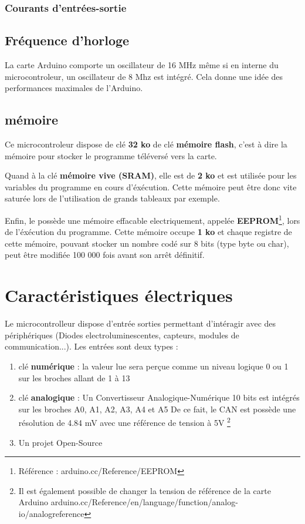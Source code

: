 \documentclass[12pt]{report}
\begin{document}
\subsubsection {Courants d'entrées-sortie}

\subsection {Fréquence d'horloge}

La carte Arduino comporte un oscillateur de 16 MHz même si en interne du microcontroleur, un oscillateur de 8 Mhz est intégré.
Cela donne une idée des performances maximales de l'Arduino.



\subsection {mémoire}

Ce microcontroleur dispose de clé \textbf{32 ko} de clé \textbf{mémoire flash}, c'est à dire la mémoire pour stocker le programme téléversé vers la carte. \newline


Quand à la clé \textbf{mémoire vive (SRAM)}, elle est de \textbf{2 ko} et est utilisée pour les variables du programme en cours d'éxécution. \newline
Cette mémoire peut être donc vite saturée lors de l'utilisation de grands tableaux par exemple. \newline


Enfin, le  possède une mémoire effacable electriquement, appelée \textbf{EEPROM}\footnote{Référence : arduino.cc/Reference/EEPROM}, lors de l'éxécution du programme. \newline
Cette mémoire occupe \textbf{1 ko} et chaque registre de cette mémoire, pouvant stocker un nombre codé sur 8 bits (type byte ou char), peut être modifiée 100 000 fois avant son arrêt définitif.\newline


\section{Caractéristiques électriques}

Le microcontrolleur dispose d'entrée sorties permettant d'intéragir avec des périphériques (Diodes electroluminescentes, capteurs, modules de communication...).
Les entrées sont deux types : 

\begin{enumerate}
\item clé \textbf{numérique} : la valeur lue sera perçue comme un niveau logique 0 ou 1 sur les broches allant de 1 à 13
\item clé \textbf{analogique} : Un Convertisseur Analogique-Numérique 10 bits est intégrés sur les broches A0, A1, A2, A3, A4 et A5
De ce fait, le CAN est possède une résolution de 4.84 mV avec une référence de tension à 5V \footnote{Il est également possible de changer la tension de référence de la carte Arduino 
arduino.cc/Reference/en/language/function/analog-io/analogreference}
\item Un projet Open-Source
\end{enumerate}
\end{document}
